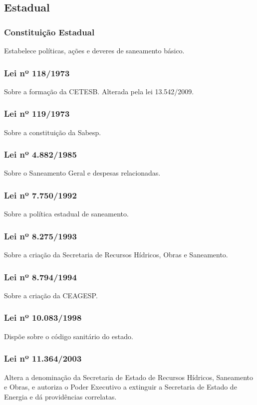 \begin{subapend}
	\subsection{Estadual}
	\begin{subsubapend}
		\subsubsection{Constituição Estadual}
		Estabelece políticas, ações e deveres de saneamento básico.
		\subsubsection{Lei nº 118/1973}
		Sobre a formação da CETESB. Alterada pela lei 13.542/2009.
		\subsubsection{Lei nº 119/1973}
		Sobre a constituição da Sabesp.
		\subsubsection{Lei nº 4.882/1985}
		Sobre o Saneamento Geral e despesas relacionadas.
		\subsubsection{Lei nº 7.750/1992}
		Sobre a política estadual de saneamento.
		\subsubsection{Lei nº 8.275/1993}
		Sobre a criação da Secretaria de Recursos Hídricos, Obras e Saneamento.
		\subsubsection{Lei nº 8.794/1994}
		Sobre a criação da CEAGESP.
		\subsubsection{Lei nº 10.083/1998}
		Dispõe sobre o código sanitário do estado.
		\subsubsection{Lei nº 11.364/2003}
		Altera a denominação da Secretaria de Estado de Recursos Hídricos, Saneamento e Obras, e autoriza o Poder Executivo a extinguir a Secretaria de Estado de Energia e dá providências correlatas.

\end{subsubapend}
\end{subapend}
